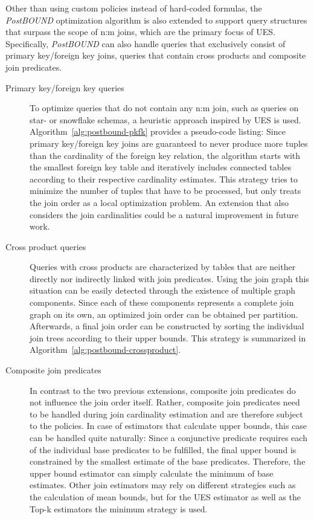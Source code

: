 Other than using custom policies instead of hard-coded formulas, the \emph{PostBOUND} optimization algorithm is also extended to support query structures that surpass the scope of n:m joins, which are the primary focus of UES. Specifically, \emph{PostBOUND} can also handle queries that exclusively consist of primary key/foreign key joins, queries that contain cross products and composite join predicates.

\begin{description}
    \item[Primary key/foreign key queries] To optimize queries that do not contain any n:m join, such as queries on star- or snowflake schemas, a heuristic approach inspired by UES is used. Algorithm~\ref{alg:postbound-pkfk} provides a pseudo-code listing: Since primary key/foreign key joins are guaranteed to never produce more tuples than the cardinality of the foreign key relation, the algorithm starts with the smallest foreign key table and iteratively includes connected tables according to their respective cardinality estimates. This strategy tries to minimize the number of tuples that have to be processed, but only treats the join order as a local optimization problem. An extension that also considers the join cardinalities could be a natural improvement in future work.
    \item[Cross product queries] Queries with cross products are characterized by tables that are neither directly nor indirectly linked with join predicates. Using the join graph this situation can be easily detected through the existence of multiple graph components. Since each of these components represents a complete join graph on its own, an optimized join order can be obtained per partition. Afterwards, a final join order can be constructed by sorting the individual join trees according to their upper bounds. This strategy is summarized in Algorithm~\ref{alg:postbound-crossproduct}.
    \item[Composite join predicates] In contrast to the two previous extensions, composite join predicates do not influence the join order itself. Rather, composite join predicates need to be handled during join cardinality estimation and are therefore subject to the policies. In case of estimators that calculate upper bounds, this case can be handled quite naturally: Since a conjunctive predicate requires each of the individual base predicates to be fulfilled, the final upper bound is constrained by the smallest estimate of the base predicates. Therefore, the upper bound estimator can simply calculate the minimum of base estimates. Other join estimators may rely on different strategies such as the calculation of mean bounds, but for the UES estimator as well as the Top-k estimators the minimum strategy is used.
\end{description}

